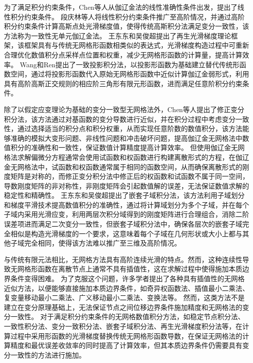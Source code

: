 为了满足积分约束条件，Chen等人从伽辽金法的线性准确性条件出发，提出了线性积分约束条件\textsuperscript{\cite{chen2001}}。
段庆林等人\textsuperscript{\cite{陈嵩涛2020几何非线性分析的高效高阶无网格法,duan2012}}将线性积分约束条件推广至高阶情况，并通过高阶积分约束条件计算高斯点处光滑梯度值，使得传统高斯积分法满足变分一致性，该方法称为一致性无单元伽辽金法。
王东东和吴俊超提出了再生光滑梯度理论框架\textsuperscript{\cite{wang2019}}，该框架具有与传统无网格形函数相类似的表达式，光滑梯度构造过程中可重新合理优化数值积分点采样点位置和权重，减少无网格形函数的计算量，提高计算效率。
Wang和Ren\textsuperscript{\cite{wang2023}}提出了一致投影积分法，以投影形函数为基础建立替代传统形函数空间，通过将投影形函数代入原始无网格形函数中近似计算伽辽金弱形式，利用具有高阶高斯正交规则的相应阶三角形有限元形函数，进而满足任意阶积分约束条件。\par
除了以假定应变理论为基础的变分一致型无网格法外，Chen等人\textsuperscript{\cite{chen1996}}提出了修正变分积分法，该方法通过对基函数的变分导数进行近似，并在积分过程中考虑变分一致性，通过选择适当的积分点和积分权重，从而实现任意阶数的数值积分，该方法能够准确的模拟大变形问题、非线性问题和冲击破坏问题，提高伽辽金无网格法中数值积分的准确性和一致性，保证数值计算精度提高计算效率。
但使用伽辽金无网格法求解偏微分方程通常会使用试函数和权函数进行构建离散形式的方程，在伽辽金无网格法中，试函数和权函数通常属于相同的函数空间，从而确保离散形式的刚度矩阵是对称的，而修正变分积分法中修正后的权函数和试函数不属于同一空间，导数刚度矩阵的非对称性，非刚度矩阵会引起数值解的误差，无法保证数值求解的稳定性和精确性。
王东东和吴俊超提出了嵌套子域积分法\textsuperscript{\cite{wang2016}}，该方法利用子域划分和梯度平滑技术提高数值积分的准确性，通过将计算域划分为多个子域，并在每个子域内采用光滑应变，利用两层次积分域得到的刚度矩阵进行合理组合，消除二阶误差项进而满足二次变分一致性，但嵌套子域积分法中，确保各层次的嵌套子域完全相似是构造光滑梯度的一个要求，这意味着每个子域在几何形状或大小上都与其他子域完全相同，使得该方法难以推广至三维及高阶情况。
\par
与传统有限元法相比，无网格方法具有高阶连续光滑的特点。然而，这种连续性导致无网格形函数在离散节点上通常不具有插值性，这在求解过程中使得施加本质边界条件变得困难。
为了克服这个问题，许多学者提出了各种具有插值性的无网格近似方法，以便能够直接施加本质边界条件\textsuperscript{\cite{CaoYang2020,fernandez-mendez2004}}，如奇异权函数法\textsuperscript{\cite{kaljevic1997}}、插值最小二乘法\textsuperscript{\cite{liu2019,ChenXinXin2021}}、复变量移动最小二乘法\textsuperscript{\cite{ChengYuMin2005}}、广义移动最小二乘法\textsuperscript{\cite{HuangJuan2007}}、变换法\textsuperscript{\cite{chen2000}}等。
然而，这类方法不是建立在变分原理基础上，无法保证节点之间位移边界条件施加精度和无网格法的变分一致性。
对于满足积分约束条件的无网格数值积分方法，如稳定节点积分法\textsuperscript{\cite{chen2001}}、一致性积分法\textsuperscript{\cite{陈嵩涛2020几何非线性分析的高效高阶无网格法,duan2012}}、变分一致积分法\textsuperscript{\cite{chen2013}}、嵌套子域积分法\textsuperscript{\cite{wang2016}}、再生光滑梯度积分法\textsuperscript{\cite{wang2019}}等，在计算过程中采用形函数的光滑梯度替换传统无网格形函数导数，在保证无网格法的计算精度和最优误差收敛率的同时提高了计算效率，但其本质边界条件仍需要具有变分一致性的方法进行施加\textsuperscript{\cite{WuJunChao2016,hillman2021}}。
